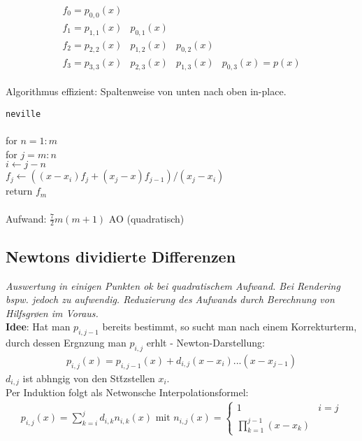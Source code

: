 \begin{align*}
\begin{array}{cccc}
f_0 = p_{0,0}(x) &             &            &  \\
f_1 = p_{1,1}(x) &  p_{0,1}(x) &            &  \\
f_2 = p_{2,2}(x) &  p_{1,2}(x) & p_{0,2}(x) &  \\
f_3 = p_{3,3}(x) &  p_{2,3}(x) & p_{1,3}(x) &  p_{0,3}(x) = p(x)
\end{array}
\end{align*}

Algorithmus effizient: Spaltenweise von unten nach oben in-place.

\verb!neville!\\
{\addtolength{\leftskip}{0mm}
\hrulefill\\
for $n=1:m$  \\
\quad for $j=m:n$  \\
\qquad $i \leftarrow j-n$  \\
\qquad $f_j \leftarrow ((x-x_i)f_j + (x_j-x)f_{j-1})/(x_j-x_i)$\\
return $f_m$ \\
\hrulefill\\
}
Aufwand: $\frac{7}{2}m (m+1)$ AO (quadratisch)

\subsection{Newtons dividierte Differenzen}
\emph{Auswertung in einigen Punkten ok bei quadratischem Aufwand. Bei Rendering bspw. jedoch zu aufwendig. Reduzierung des Aufwands durch Berechnung von Hilfsgr\o \s en im Voraus.}\\

\textbf{Idee}: Hat man $p_{i,j-1}$ bereits bestimmt, so sucht man nach einem Korrekturterm, durch dessen Erg\a nzung man $p_{i,j}$ erh\a lt - Newton-Darstellung:
\begin{align*}
p_{i,j}(x) = p_{i,j-1}(x) + d_{i,j}(x- x_i)...(x-x_{j-1})
\end{align*}
$d_{i,j}$ ist abh\a ngig von den St\u tzstellen $x_i$.\\

Per Induktion folgt als Netwonsche Interpolationsformel:
\begin{align*}
p_{i,j}(x) = \sum_{k=i}^j d_{i,k}n_{i,k}(x) \text{ mit }  n_{i,j}(x)=\begin{cases} 1 & i=j \\ \prod_{k=1}^{j-1}(x-x_k)&\end{cases}
\end{align*}

